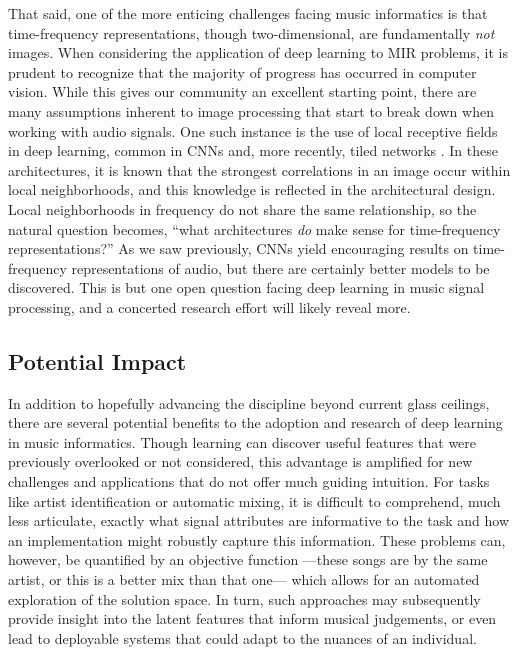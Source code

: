 That said, one of the more enticing challenges facing music informatics is that time-frequency representations, though two-dimensional, are fundamentally \emph{not} images.
When considering the application of deep learning to MIR problems, it is prudent to recognize that the majority of progress has occurred in computer vision.
While this gives our community an excellent starting point, there are many assumptions inherent to image processing that start to break down when working with audio signals.
One such instance is the use of local receptive fields in deep learning, common in CNNs and, more recently, tiled networks \cite{Le2010}.
In these architectures, it is known that the strongest correlations in an image occur within local neighborhoods, and this knowledge is reflected in the architectural design.
Local neighborhoods in frequency do not share the same relationship, so the natural question becomes, ``what architectures \emph{do} make sense for time-frequency representations?''
As we saw previously, CNNs yield encouraging results on time-frequency representations of audio, but there are certainly better models to be discovered.
This is but one open question facing deep learning in music signal processing, and a concerted research effort will likely reveal more.


\subsection{Potential Impact}

In addition to hopefully advancing the discipline beyond current glass ceilings, there are several potential benefits to the adoption and research of deep learning in music informatics.
Though learning can discover useful features that were previously overlooked or not considered, this advantage is amplified for new challenges and applications that do not offer much guiding intuition.
For tasks like artist identification or automatic mixing, it is difficult to comprehend, much less articulate, exactly what signal attributes are informative to the task and how an implementation might robustly capture this information.
These problems can, however, be quantified by an objective function ---these songs are by the same artist, or this is a better mix than that one--- which allows for an automated exploration of the solution space.
In turn, such approaches may subsequently provide insight into the latent features that inform musical judgements, or even lead to deployable systems that could adapt to the nuances of an individual.

